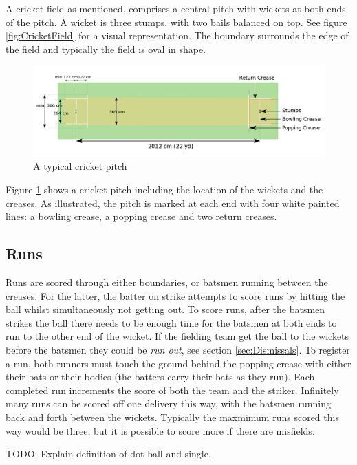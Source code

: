 \documentclass[12pt,a4paper]{report}
\theoremstyle{definition}
\begin{document}
A cricket field as mentioned, comprises a central pitch with wickets at both ends of the pitch. 
A wicket is three stumps, with two bails balanced on top. 
See figure \ref{fig:CricketField} for a visual representation.
The boundary surrounds the edge of the field and typically the field is oval in shape.

\begin{figure}[H]
    \centering
    \includegraphics[width=0.8\linewidth]{Cricket_Pitch.png}
    \caption{A typical cricket pitch \citep{cricketWiki}}
    \label{fig:CricketPitch}
\end{figure}

Figure \ref{fig:CricketPitch} shows a cricket pitch including the location of the wickets and the creases.
As illustrated, the pitch is marked at each end with four white painted lines: a bowling crease, a popping crease and two return creases.

\subsection{Runs} \label{sec:Runs}

Runs are scored through either boundaries, or batsmen running between the creases.
For the latter, the batter on strike attempts to score runs by hitting the ball whilst simultaneously not getting out. 
To score runs, after the batsmen strikes the ball there needs to be enough time for the batsmen at both ends to run to the other end of the wicket.
If the fielding team get the ball to the wickets before the batsmen they could be \emph{run out}, see section \ref{sec:Dismissals}.
To register a run, both runners must touch the ground behind the popping crease with either their bats or their bodies (the batters carry their bats as they run). 
Each completed run increments the score of both the team and the striker.
Infinitely many runs can be scored off one delivery this way, with the batsmen running back and forth between the wickets.
Typically the maxmimum runs scored this way would be three, but it is possible to score more if there are misfields.

TODO:  Explain definition of dot ball and single.
\end{document}
